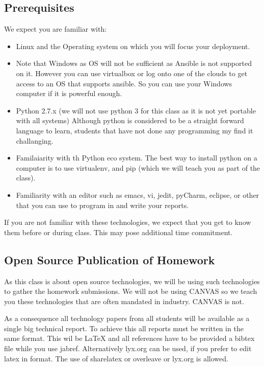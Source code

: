 \subsection{Prerequisites}
\label{\detokenize{i524/index:prerequisites}}\label{\detokenize{i524/index:ref-i524-prerequisits}}
We expect you are familiar with:
\begin{itemize}
\item {} 
Linux and the Operating system on which you will focus your
deployment.

\item {} 
Note that Windows as OS will not be sufficient as Ansible
is not supported on it. However you can use virtualbox or log onto
one of the clouds to get access to an OS that supports ansible. So
you can use your Windows computer if it is powerful enough.

\item {} 
Python 2.7.x (we will not use python 3 for this class as it
is not yet portable with all systems) Although python is considered
to be a straight forward language to learn, students that have not
done any programming my find it challanging.

\item {} 
Familaiarity with th Python eco system. The best way to install
python on a computer is to use virtualenv, and pip (which we will
teach you as part of the class).

\item {} 
Familiarity with an editor such as emacs, vi, jedit, pyCharm,
eclipse, or other that you can use to program in and write your
reports.

\end{itemize}

If you are not familiar with these technologies, we expect that you
get to know them before or during class. This may pose additional time
commitment.


\subsection{Open Source Publication of Homework}
\label{\detokenize{i524/index:open-source-publication-of-homework}}
As this class is about open source technologies, we will be using such
technologies to gather the homework submissions. We will not be using
CANVAS so we teach you these technologies that are often mandated in
industry. CANVAS is not.

As a consequence all technology papers from all students will be
available as a single big technical report. To achieve this all
reports must be written in the same format. This wil be LaTeX and all
references have to be provided a bibtex file while you use jabref.
Alternatively lyx.org can be used, if you prefer to edit
latex in  format. The use of
sharelatex or overleave or lyx.org is allowed.


